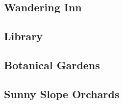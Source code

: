 

\subsection{Wandering Inn}


\subsection{Library}


\subsection{Botanical Gardens}


\subsection{Sunny Slope Orchards}

